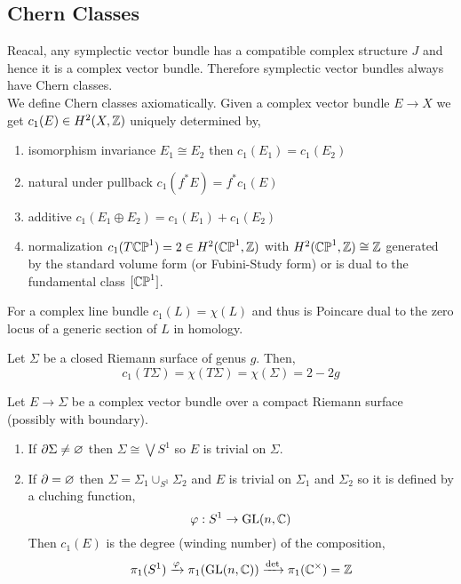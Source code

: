 \documentclass[12pt]{article}
\begin{document}
\subsection{Chern Classes}

Reacal, any symplectic vector bundle has a compatible complex structure $J$ and hence it is a complex vector bundle. Therefore symplectic vector bundles always have Chern classes. 
\bigskip\\
We define Chern classes axiomatically. Given a complex vector bundle $E \to X$ we get $c_1(E) \in H^2(X, \mathbb{Z})$ uniquely determined by,
\begin{enumerate}
\item isomorphism invariance $E_1 \cong E_2$ then $c_1(E_1) = c_1(E_2)$
\item natural under pullback $c_1(f^* E) = f^* c_1(E)$
\item additive $c_1(E_1 \oplus E_2) = c_1(E_1) + c_1(E_2)$
\item normalization $c_1(T \mathbb{CP}^1) = 2 \in H^2(\mathbb{CP}^1, \mathbb{Z})$ with $H^2(\mathbb{CP}^1, \mathbb{Z}) \cong \mathbb{Z}$ generated by the standard volume form (or Fubini-Study form) or is dual to the fundamental class $[\mathbb{CP}^1]$. 
\end{enumerate}

\begin{prop}
For a complex line bundle $c_1(L) = \chi(L)$ and thus is Poincare dual to the zero locus of a generic section of $L$ in homology. 
\end{prop}

\begin{example}
Let $\Sigma$ be a closed Riemann surface of genus $g$. Then,
\[ c_1(T\Sigma) = \chi(T \Sigma) = \chi(\Sigma) = 2 - 2 g \]
\end{example}

\begin{example}
Let $E \to \Sigma$ be a complex vector bundle over a compact Riemann surface (possibly with boundary). 
\begin{enumerate}
\item If $\partial \Sigma \neq \varnothing$ then $\Sigma \cong \bigvee S^1$ so $E$ is trivial on $\Sigma$.
\item If $\partial = \varnothing$ then $\Sigma = \Sigma_1 \cup_{S^1} \Sigma_2$ and $E$ is trivial on $\Sigma_1$ and $\Sigma_2$ so it is defined by a cluching function,
\[ \varphi : S^1 \to \mathrm{GL}(n,\mathbb{C}) \]
Then $c_1(E)$ is the degree (winding number) of the composition,
\[ \pi_1(S^1) \xrightarrow{\varphi} \pi_1(\mathrm{GL}(n,\mathbb{C})) \xrightarrow{\det} \pi_1(\mathbb{C}^\times) = \mathbb{Z} \]
\end{enumerate}
\end{example}
\end{document}
